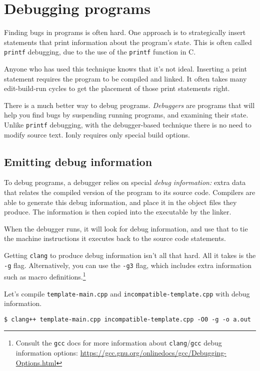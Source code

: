 \documentclass[12pt,a4paper]{article}
\newcommand{\gcc}{\texttt{gcc}}
\newcommand{\clang}{\texttt{clang}}
\newcommand{\CC}{\clang{}}
\newcommand{\labelname}[1]{\texttt{#1}}
\newcommand{\functionname}[1]{\labelname{#1}}
\newcommand{\filename}[1]{\texttt{#1}}
\begin{document}
\section{Debugging programs}

Finding bugs in programs is often hard. One approach is to strategically insert statements that print information about the program's state. This is often called \functionname{printf} debugging, due to the use of the \functionname{printf} function in C.

Anyone who has used this technique knows that it's not ideal. Inserting a print statement requires the program to be compiled and linked. It often takes many edit-build-run cycles to get the placement of those print statements right.

There is a much better way to debug programs. \emph{Debuggers} are programs that will help you find bugs by suspending running programs, and examining their state. Unlike \texttt{printf} debugging, with the debugger-based technique there is no need to modify source text. Ionly requires only special build options.

\subsection{Emitting debug information}

To debug programs, a debugger relies on special \emph{debug information:} extra data that relates the compiled version of the program to its source code. Compilers are able to generate this debug information, and place it in the object files they produce. The information is then copied into the executable by the linker.

When the debugger runs, it will look for debug information, and use that to tie the machine instructions it executes back to the source code statements.

Getting \CC{} to produce debug information isn't all that hard. All it takes is the \texttt{-g} flag. Alternatively, you can use the \texttt{-g3} flag, which includes extra information such as macro definitions.\footnote{Consult the \gcc{} docs for more information about \clang{}/\gcc{} debug information options: \url{https://gcc.gnu.org/onlinedocs/gcc/Debugging-Options.html}}

Let's compile \filename{template-main.cpp} and \filename{incompatible-template.cpp} with debug information. \\

\begin{lstlisting}[caption=compiling with debug information]
$ clang++ template-main.cpp incompatible-template.cpp -O0 -g -o a.out
\end{lstlisting}
\end{document}
